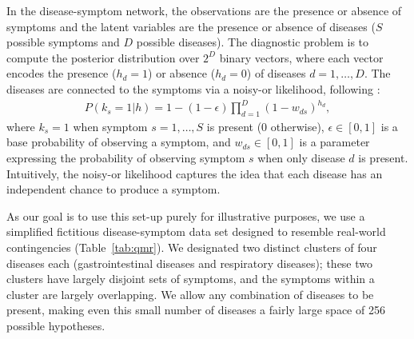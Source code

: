 In the disease-symptom network, the observations are the presence or absence of symptoms and the latent variables are the presence or absence of diseases ($S$ possible symptoms and $D$ possible diseases). The diagnostic problem is to compute the posterior distribution over $2^D$ binary vectors, where each vector encodes the presence ($h_d=1$) or absence ($h_d=0$) of diseases $d = 1,\ldots,D$. The diseases are connected to the symptoms via a noisy-or likelihood, following \cite{shwe1991probabilistic}:
\begin{align}
P(k_s = 1|h) = 1 - (1-\epsilon) \prod_{d=1}^D (1-w_{ds})^{h_d},
\end{align}
where $k_s = 1$ when symptom $s = 1, \ldots, S$ is present (0 otherwise), $\epsilon \in [0,1]$ is a base probability of observing a symptom, and $w_{ds} \in [0,1]$ is a parameter expressing the probability of observing symptom $s$ when only disease $d$ is present. Intuitively, the noisy-or likelihood captures the idea that each disease has an independent chance to produce a symptom.

As our goal is to use this set-up purely for illustrative purposes, we use a simplified fictitious disease-symptom data set designed to resemble real-world contingencies (Table~\ref{tab:qmr}). We designated two distinct clusters of four diseases each (gastrointestinal diseases and respiratory diseases); these two clusters have largely disjoint sets of symptoms, and the symptoms within a cluster are largely overlapping. We allow any combination of diseases to be present, making even this small number of diseases a fairly large space of 256 possible hypotheses.

